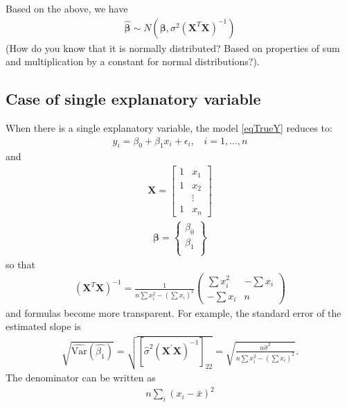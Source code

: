\documentclass[11pt]{article}
\theoremstyle{remark}
\begin{document}
Based on the above, we have
\begin{eqnarray}
\boldsymbol{\hat{\beta}}\sim N(\boldsymbol{\beta},\sigma^2 \left(\mathbf{X}^T\mathbf{X}\right)^{-1})
\label{NormallyDistributedBetaHat}
\end{eqnarray}
(How do you know that it is normally distributed? Based on properties of sum and multiplication by a constant for normal distributions?).

\subsection{Case of single explanatory variable}
When there is a single explanatory variable, the model \eqref{eqTrueY} reduces to:
\begin{eqnarray}
y_i = \beta_0 + \beta_1 x_i + \epsilon_i,\:\:\:\:i = 1,\hdots,n
\end{eqnarray}
and
\begin{eqnarray}
\mathbf{X} =
\left[
\begin{array}{cc}
1 & x_1\\
1 & x_2\\
  & \vdots\\
1 & x_n
\end{array}
\right]
\end{eqnarray}
\begin{eqnarray}
\boldsymbol{\beta} =
\left\{
\begin{array}{c}
\beta_0\\
\beta_1\\
\end{array}
\right\}
\end{eqnarray}
so that
\begin{eqnarray}
(\mathbf{X}^T \mathbf{X})^{-1} = \frac{1}{n\sum x_i^2 - (\sum x_i)^2}
\left(
\begin{array}{cc}
\sum x_i^2 & -\sum x_i \\
-\sum x_i  & n
\end{array}
\right)
\end{eqnarray}
and formulas become more transparent. For example, the standard error of the estimated slope is
\begin{eqnarray}
\sqrt{\widehat{\text{Var}}(\hat{\beta_1})} = \sqrt{[\hat{\sigma}^2  (\mathbf{X}^{\prime} \mathbf{X})^{-1}]_{22}} = \sqrt{\frac{n \hat{\sigma}^2}{n\sum x_i^2 - (\sum x_i)^2}}.
\end{eqnarray}
The denominator can be written as
\begin{eqnarray}
n \sum_i (x_i - \bar{x})^2
\end{eqnarray}
\end{document}
